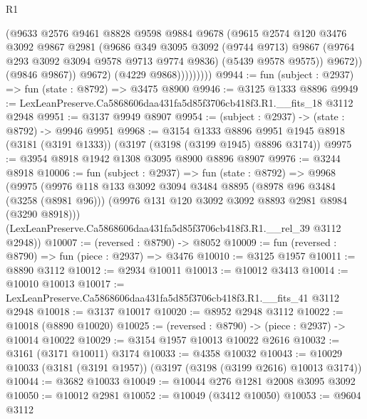 \begin{lexlean}{R1}
\begin{coremodule}
                        (@9633
                          @2576
                          @9461
                          @8828
                          @9598
                          @9884
                          @9678
                          (@9615
                            @2574
                            @120
                            @3476
                            @3092
                            @9867
                            @2981
                            (@9686
                              @349
                              @3095
                              @3092
                              (@9744 @9713)
                              @9867
                              (@9764 @293 @3092 @3094 @9578 @9713 @9774 @9836)
                              (@5439 @9578 @9575))
                            @9672))
                        (@9846 @9867))
                      @9672)
                    (@4229 @9868)))))))))
@9944 := fun (subject : @2937) => fun (state : @8792) => @3475 @8900
@9946 := @3125 @1333 @8896
@9949 := LexLeanPreserve.Ca5868606daa431fa5d85f3706cb418f3.R1.__fits_18 @3112 @2948
@9951 := @3137 @9949 @8907
@9954 := (subject : @2937) -> (state : @8792) -> @9946 @9951
@9968 := @3154
    @1333
    @8896
    @9951
    @1945
    @8918
    (@3181 (@3191 @1333))
    (@3197 (@3198 (@3199 @1945) @8896 @3174))
@9975 := @3954 @8918 @1942 @1308 @3095 @8900 @8896 @8907
@9976 := @3244 @8918
@10006 := fun (subject : @2937) =>
  fun (state : @8792) =>
  @9968
    (@9975
      (@9976
        @118
        @133
        @3092
        @3094
        @3484
        @8895
        (@8978 @96 @3484 (@3258 (@8981 @96)))
        (@9976 @131 @120 @3092 @3092 @8893 @2981 @8984 (@3290 @8918)))
      (LexLeanPreserve.Ca5868606daa431fa5d85f3706cb418f3.R1.__rel_39 @3112 @2948))
@10007 := (reversed : @8790) -> @8052
@10009 := fun (reversed : @8790) => fun (piece : @2937) => @3476
@10010 := @3125 @1957
@10011 := @8890 @3112
@10012 := @2934 @10011
@10013 := @10012 @3413
@10014 := @10010 @10013
@10017 := LexLeanPreserve.Ca5868606daa431fa5d85f3706cb418f3.R1.__fits_41 @3112 @2948
@10018 := @3137 @10017
@10020 := @8952 @2948 @3112
@10022 := @10018 (@8890 @10020)
@10025 := (reversed : @8790) -> (piece : @2937) -> @10014 @10022
@10029 := @3154 @1957 @10013 @10022 @2616
@10032 := @3161 (@3171 @10011) @3174
@10033 := @4358 @10032
@10043 := @10029 @10033 (@3181 (@3191 @1957)) (@3197 (@3198 (@3199 @2616) @10013 @3174))
@10044 := @3682 @10033
@10049 := @10044 @276 @1281 @2008 @3095 @3092
@10050 := @10012 @2981
@10052 := @10049 (@3412 @10050)
@10053 := @9604 @3112

\end{coremodule}
\end{lexlean}
